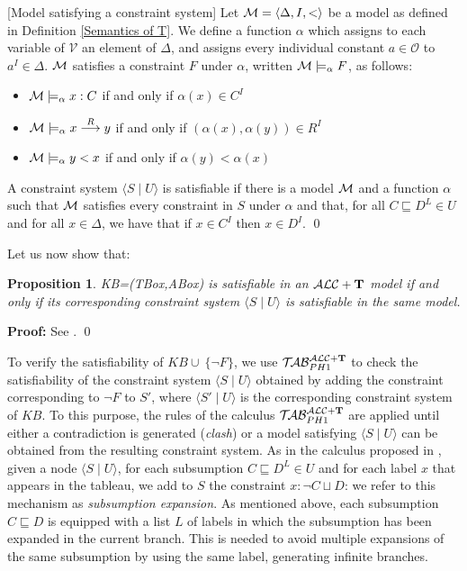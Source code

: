 \documentclass[a4paper, 11pt, oneside]{duthesis}
\newcommand{\tip}{{\bf T}}
\newcommand{\alct}{\mathcal{ALC}+\tip}
\newcommand{\unione} {\cup}
\newcommand{\unioneq}{\sqcup}
\newcommand{\nott} {\lnot}
\newcommand{\tc} {\mid}
\newcommand{\sx} {\langle}
\newcommand{\dx} {\rangle}
\newcommand{\emme} {\begin{mathcal}M\end{mathcal}}
\newcommand{\primo}{\mathrel{{\mathcal{T}\!\mathcal{AB}}}_{PH 1}^{\mathcal{ALC}+\mbox{\scriptsize $\tip$}}}
\newcommand{\trans}[1]{\stackrel{#1}{\longrightarrow}}
\newenvironment{proof}
{\begin{trivlist} \item[] {\bf Proof:}}%
{\qed \end{trivlist}}
\newenvironment{definition}
{\begin{defi} \rm}{\qed \end{defi}}
\newenvironment{proof}
{\begin{trivlist} \item[] {\bf Proof:}}%
{\qed \end{trivlist}}
\newenvironment{definition}
{\begin{defi} \rm}{\qed \end{defi}}
\newtheorem{definition}{Definition}
\newtheorem{proposition}{Proposition}
\newcounter{posu}
\newtheorem{proposition}[posu]{Proposition}
\newtheorem{definition}[posu]{Definition}
\newtheorem{proof}[posu]{Proof}
\begin{document}
\begin{definition}[Model satisfying a constraint system]\label{modello constraint}
Let $\emme=\sx \Delta, I, < \dx$ be a model as defined in Definition \ref{Semantics of T}. We define a function $\alpha$ which assigns to each variable of $\mathcal{V}$ an element of $\Delta$, and assigns every individual constant $a \in \mathcal{O}$ to $a^{I} \in \Delta$.
$\emme$ satisfies  a constraint $F$ under $\alpha$, written $\emme \models_\alpha F$, as follows:

\begin{itemize}
 \item $\emme \models_\alpha x: C$  if and only if $\alpha(x) \in C^{I}$
 \item $\emme \models_\alpha x \trans{R} y$ if and only if $(\alpha(x),\alpha(y)) \in R^{I}$
 \item $\emme \models_\alpha y < x$ if and only if $\alpha(y) < \alpha(x)$
\end{itemize}

A constraint system $\sx S \tc U \dx$ is satisfiable if there is a model $\emme$ and a function $\alpha$ such that $\emme$ satisfies  every constraint in $S$ under $\alpha$ and that, for all $C \sqsubseteq D^L \in U$ and for all $x \in \Delta$, we have that if $x \in C^I$ then $x \in D^I$.
\end{definition}

Let us now show that:

\begin{proposition}\label{corresp constr system} KB=(TBox,ABox) is satisfiable in an $\alct$ model if
and only if its corresponding constraint system $\sx S \tc U \dx$ is satisfiable in the same model.
\end{proposition}

\begin{proof}
See \cite{Giordano:2013:NDL:2435476.2435957}.
\end{proof}


\noindent To verify the satisfiability of $KB \unione \ \{ \nott F\}$, we use $\primo$ to check the satisfiability of the constraint system $\sx S \tc U \dx$ obtained by adding the constraint corresponding to $\nott F$ to $S'$, where $\sx S' \tc U \dx$ is the corresponding constraint system of $KB$. To this purpose, the rules of the calculus $\primo$ are applied until either a contradiction is generated (\emph{clash}) or a model satisfying $\sx S \tc U \dx$ can be obtained from the resulting constraint system.
As in the calculus proposed in \cite{FI09}, given a node $\sx S \tc U \dx$, for each subsumption $C \sqsubseteq D^L \in U$ and for each label $x$ that appears in the tableau, we add to $S$ the constraint $x: \nott C \unioneq D$: we refer to this mechanism as \emph{subsumption expansion}.
As mentioned above, each subsumption $C \sqsubseteq D$ is equipped with a list $L$ of labels in which the subsumption has been expanded in the current branch.
This is needed to avoid multiple expansions of the same subsumption by using the same label, generating infinite branches.
\end{document}
